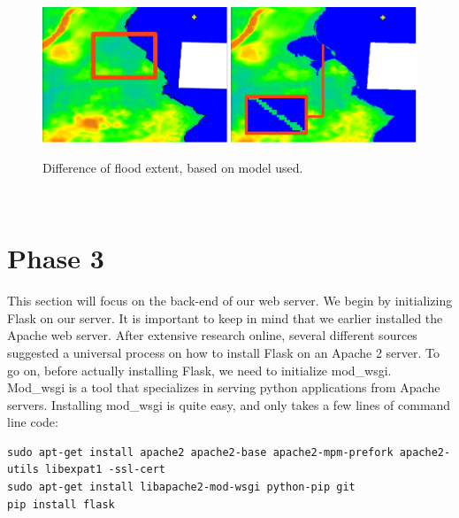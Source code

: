 \begin{figure}[H!]
\centering
	{\includegraphics[width=\linewidth]{gfx/Phase_2/problem4.png}}
\caption{Difference of flood extent, based on model used.}
\label{fig:phase2_prob4}
\end{figure}\\

\section{Phase 3}
This section will focus on the back-end of our web server. We begin by initializing Flask on our server. It is important to keep in mind that we earlier installed the Apache web server. After extensive research online, several different sources suggested a universal process on how to install Flask on an Apache 2 server. To go on, before actually installing Flask, we need to initialize mod\_wsgi. Mod\_wsgi is a tool that specializes in serving python applications from Apache servers. Installing mod\_wsgi is quite easy, and only takes a few lines of command line code: \\

\begin{lstlisting}
sudo apt-get install apache2 apache2-base apache2-mpm-prefork apache2-utils libexpat1 -ssl-cert
sudo apt-get install libapache2-mod-wsgi python-pip git
pip install flask
\end{lstlisting}\\

